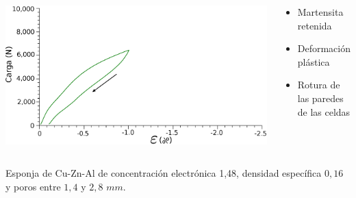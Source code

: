 \documentclass[usenames,dvipsnames]{beamer}
\begin{document}
\begin{frame}
\begin{columns}
 \includegraphics[width=\textwidth]{img/intro/Graph522b.eps}
  \begin{small}
\begin{itemize}
 \item Martensita retenida
 \item Deformación plástica
 \item Rotura de las paredes de las celdas
\end{itemize}
\end{small}
 \end{columns}
 \vspace{0.5 cm}
 \begin{small}
Esponja de Cu-Zn-Al de concentración electrónica 1,48, densidad específica $0,16$ y poros entre $1,4$ y $2,8$ $mm$.
\end{small}
\end{frame}


\end{document}
